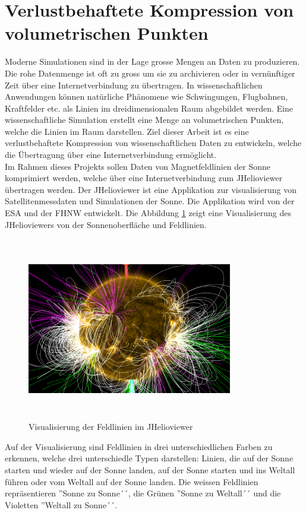 \section{Verlustbehaftete Kompression von volumetrischen Punkten}\label{einleitung}
Moderne Simulationen sind in der Lage grosse Mengen an Daten zu produzieren. Die rohe Datenmenge ist oft zu gross um sie zu archivieren oder in vernünftiger Zeit über eine Internetverbindung zu übertragen. In wissenschaftlichen Anwendungen können natürliche Phänomene wie Schwingungen, Flugbahnen, Kraftfelder etc. als Linien im dreidimensionalen Raum abgebildet werden. Eine wissenschaftliche Simulation erstellt eine Menge an volumetrischen Punkten, welche die Linien im Raum darstellen. Ziel dieser Arbeit ist es eine verlustbehaftete Kompression von wissenschaftlichen Daten zu entwickeln, welche die Übertragung über eine Internetverbindung ermöglicht.\\
[\baselineskip]
Im Rahmen dieses Projekts sollen Daten von Magnetfeldlinien der Sonne komprimiert werden, welche über eine Internetverbindung zum JHelioviewer übertragen werden. Der JHelioviewer ist eine Applikation zur visualisierung von Satellitenmessdaten und Simulationen der Sonne. Die Applikation wird von der ESA und der FHNW entwickelt. Die Abbildung \ref{einleitung::feldlinien} zeigt eine Visualisierung des JHelioviewers von der Sonnenoberfläche und Feldlinien.\\
\begin{figure}[!htbp]
\center
	\includegraphics[width=0.8\textwidth,height=8cm,keepaspectratio]{./pictures/einleitung/fieldLines.png}
	\caption{Visualisierung der Feldlinien im JHelioviewer}
	\label{einleitung::feldlinien}
\end{figure}
Auf der Visualisierung sind Feldlinien in drei unterschiedlichen Farben zu erkennen, welche drei unterschiedle Typen darstellen: Linien, die auf der Sonne starten und wieder auf der Sonne landen, auf der Sonne starten und ins Weltall führen oder vom Weltall auf der Sonne landen. Die weissen Feldlinien repräsentieren ''Sonne zu Sonne´´, die Grünen ''Sonne zu Weltall´´ und die Violetten ''Weltall zu Sonne´´.\\
